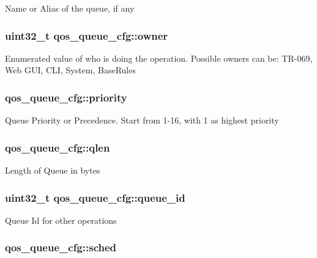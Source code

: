 Name or Alias of the queue, if any \hypertarget{structqos__queue__cfg_af7f5644a58135f1b6f52a818ce958675}{
\subsubsection[{owner}]{\setlength{\rightskip}{0pt plus 5cm}uint32\-\_\-t qos\-\_\-queue\-\_\-cfg\-::owner}}\label{structqos__queue__cfg_af7f5644a58135f1b6f52a818ce958675}
Enumerated value of who is doing the operation. Possible owners can be\-: T\-R-\/069, Web G\-U\-I, C\-L\-I, System, Base\-Rules \hypertarget{structqos__queue__cfg_a0016a6fbcc623edf864ce6b0a51e4a53}{
\subsubsection[{priority}]{ qos\-\_\-queue\-\_\-cfg\-::priority}}\label{structqos__queue__cfg_a0016a6fbcc623edf864ce6b0a51e4a53}
Queue Priority or Precedence. Start from 1-\/16, with 1 as highest priority \hypertarget{structqos__queue__cfg_a11b6e0171620866d462244ccaf97e40a}{
\subsubsection[{qlen}]{ qos\-\_\-queue\-\_\-cfg\-::qlen}}\label{structqos__queue__cfg_a11b6e0171620866d462244ccaf97e40a}
Length of Queue in bytes \hypertarget{structqos__queue__cfg_ab510e8e08dc8ab97b37e80cd86025c2b}{
\subsubsection[{queue\-\_\-id}]{\setlength{\rightskip}{0pt plus 5cm}uint32\-\_\-t qos\-\_\-queue\-\_\-cfg\-::queue\-\_\-id}}\label{structqos__queue__cfg_ab510e8e08dc8ab97b37e80cd86025c2b}
Queue Id for other operations \hypertarget{structqos__queue__cfg_afd37a80d7d3748ec6e8b6e28adc006b4}{
\subsubsection[{sched}]{ qos\-\_\-queue\-\_\-cfg\-::sched}}\label{structqos__queue__cfg_afd37a80d7d3748ec6e8b6e28adc006b4}

